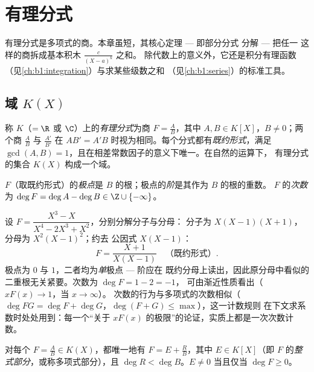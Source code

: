 \chapter{有理分式}\label{ch:b1:fractions}

有理分式是多项式的商。本章虽短，其核心定理
--- 即部分分式
分解 --- 把任一
这样的商拆成基本积木 $\frac{c}{(X - a)^k}$ 之和。
除代数上的意义外，它还是积分有理函数
（见\cref{ch:b1:integration}）与求某些级数之和
（见\cref{ch:b1:series}）的标准工具。

\section{域 $K(X)$}

\begin{definition}\label{def:b1:fractions:field}
称 $K$（$= \R$
或 $\C$）上的\emph{有理分式}为商 $F = \frac{A}{B}$，其中 $A, B \in K[X]$，$B \neq
0$；两个商 $\frac AB$ 与 $\frac{A'}{B'}$ 在
$AB' = A'B$ 时视为相同。每个分式都有\emph{既约形式}，满足
$\gcd(A, B) = 1$，且在相差常数因子的意义下唯一。在自然的运算下，
有理分式的集合 $K(X)$ 构成一个域。

$F$（取既约形式）的\emph{极点}是
$B$ 的根；极点的\emph{阶}是其作为 $B$ 的根的重数。
$F$ 的\emph{次数}为 $\deg F = \deg A - \deg B \in \Z \cup
\{-\infty\}$。
\end{definition}

\begin{example}\label{ex:b1:fractions:vocab}
设 $F = \dfrac{X^3 - X}{X^4 - 2X^3 + X^2}$，分别分解分子与分母：
分子为 $X(X-1)(X+1)$，分母为 $X^2(X-1)^2$；约去
公因式 $X(X-1)$：
\[
F = \frac{X + 1}{X(X - 1)} \quad\text{（既约形式）.}
\]
极点为 $0$ 与 $1$，二者均为\emph{单}极点 --- 阶应在
既约分母上读出，因此原分母中看似的
二重根无关紧要。次数为 $\deg F = 1 - 2 = -1$，
可由渐近性质看出（$xF(x) \to 1$，当 $x \to \infty$）。
次数的行为与多项式的次数相似（$\deg FG = \deg F +
\deg G$，$\deg(F + G) \leq \max$），这一计数规则
在下文求系数时处处用到：每一个“关于
$xF(x)$ 的极限”的论证，实质上都是一次次数计数。
\end{example}

\begin{proposition}[整式部分]\label{prop:b1:fractions:integerpart}
对每个 $F = \frac AB \in K(X)$，都唯一地有 $F = E + \frac RB$，其中 $E
\in K[X]$（即 $F$ 的\emph{整式部分}，或称多项式部分），且
$\deg R < \deg B$。$E \neq 0$ 当且仅当 $\deg F \geq 0$。
\end{proposition}

